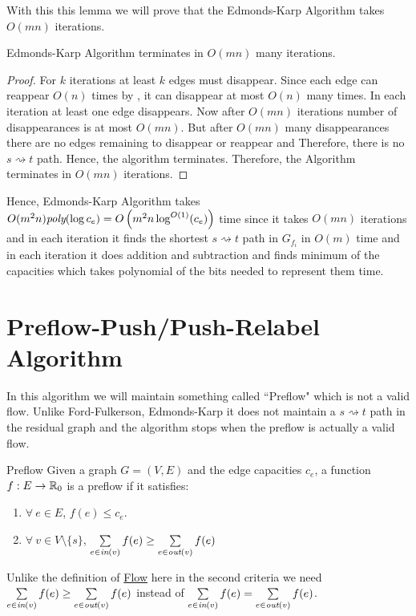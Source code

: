 With this this lemma we will prove that the Edmonds-Karp Algorithm takes $O(mn)$ iterations.
\begin{Theorem}{}{}
	Edmonds-Karp Algorithm terminates in $O(mn)$ many iterations.
\end{Theorem}
\begin{proof}
	For $k$ iterations at least $k$ edges must disappear. Since each edge can reappear $O(n)$ times by , it can disappear at most $O(n)$ many times. In each iteration at least one edge disappears. Now after $O(mn)$ iterations number of disappearances is at most $O(mn)$. But after $O(mn)$ many disappearances  there are no edges remaining to disappear or reappear and Therefore, there is no $s\rightsquigarrow t$ path. Hence, the algorithm terminates. Therefore, the Algorithm terminates in $O(mn)$ iterations.
\end{proof}

Hence, Edmonds-Karp Algorithm takes $O(m^2n)\emph{poly}(\log c_e)=O\left(m^2n\log^{O(1)}(c_e)\right)$ time since it takes $O(mn)$ iterations and in each iteration it finds the shortest $s\rightsquigarrow t$ path in $G_{f_i}$ in $O(m)$ time and in each iteration it does addition and subtraction and finds minimum of the capacities which takes polynomial of the bits needed to represent them time.
\section{Preflow-Push/Push-Relabel Algorithm}
In this algorithm we will maintain something called ``Preflow" which is not a valid flow. Unlike Ford-Fulkerson, Edmonds-Karp it does not maintain a $s\rightsquigarrow t$ path in the residual graph and the algorithm stops when the preflow is actually a valid flow.
\begin{Definition}{Preflow}{}
	Given a graph $G=(V,E)$  and the edge capacities $c_e$, a function $f:E\to \mathbb{R}_0$ is a preflow if it satisfies:
	\begin{enumerate}[label=\protect\circled{\arabic*}]
		\item $\forall\ e\in E$, $f(e)\leq c_e$.
		\item $\forall \ v\in V\setminus\{s\}$, $\sum\limits_{e\in\emph{in}(v)}f(e)\geq \sum\limits_{e\in\emph{out}(v)}f(e)$
	\end{enumerate}
\end{Definition}
\begin{observation}
	Unlike the definition of \hyperref[def:flow]{Flow} here in the second criteria we need  $\sum\limits_{e\in\emph{in}(v)}f(e)\geq \sum\limits_{e\in\emph{out}(v)}f(e)$ instead of  $\sum\limits_{e\in\emph{in}(v)}f(e)= \sum\limits_{e\in\emph{out}(v)}f(e)$.
\end{observation}

